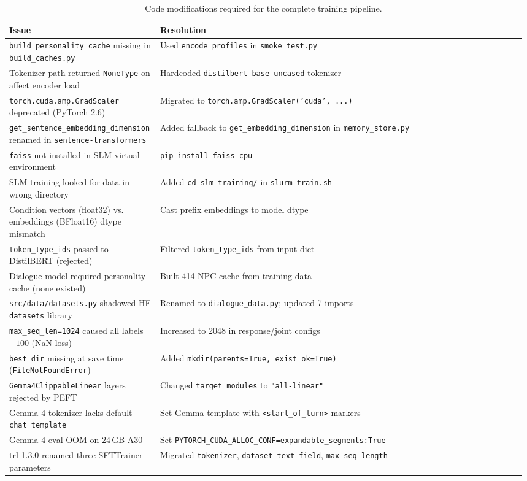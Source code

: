 \documentclass[11pt]{article}
\begin{document}
\begin{table}[t]
\centering
\caption{Code modifications required for the complete training pipeline.}
\label{tab:codefixes}
\scriptsize
\begin{tabular}{@{}p{0.28\linewidth}p{0.70\linewidth}@{}}
\toprule
\textbf{Issue} & \textbf{Resolution} \\
\midrule
\texttt{build\_personality\_cache} missing in \texttt{build\_caches.py} & Used \texttt{encode\_profiles} in \texttt{smoke\_test.py} \\
\midrule
Tokenizer path returned \texttt{NoneType} on affect encoder load & Hardcoded \texttt{distilbert-base-uncased} tokenizer \\
\midrule
\texttt{torch.cuda.amp.GradScaler} deprecated (PyTorch 2.6) & Migrated to \texttt{torch.amp.GradScaler('cuda', ...)} \\
\midrule
\texttt{get\_sentence\_embedding\_dimension} renamed in \texttt{sentence-transformers} & Added fallback to \texttt{get\_embedding\_dimension} in \texttt{memory\_store.py} \\
\midrule
\texttt{faiss} not installed in SLM virtual environment & \texttt{pip install faiss-cpu} \\
\midrule
SLM training looked for data in wrong directory & Added \texttt{cd slm\_training/} in \texttt{slurm\_train.sh} \\
\midrule
Condition vectors (float32) vs. embeddings (BFloat16) dtype mismatch & Cast prefix embeddings to model dtype \\
\midrule
\texttt{token\_type\_ids} passed to DistilBERT (rejected) & Filtered \texttt{token\_type\_ids} from input dict \\
\midrule
Dialogue model required personality cache (none existed) & Built 414-NPC cache from training data \\
\midrule
\texttt{src/data/datasets.py} shadowed HF \texttt{datasets} library & Renamed to \texttt{dialogue\_data.py}; updated 7 imports \\
\midrule
\texttt{max\_seq\_len=1024} caused all labels $-100$ (NaN loss) & Increased to 2048 in response/joint configs \\
\midrule
\texttt{best\_dir} missing at save time (\texttt{FileNotFoundError}) & Added \texttt{mkdir(parents=True, exist\_ok=True)} \\
\midrule
\texttt{Gemma4ClippableLinear} layers rejected by PEFT & Changed \texttt{target\_modules} to \texttt{"all-linear"} \\
\midrule
Gemma 4 tokenizer lacks default \texttt{chat\_template} & Set Gemma template with \texttt{<start\_of\_turn>} markers \\
\midrule
Gemma 4 eval OOM on 24\,GB A30 & Set \texttt{PYTORCH\_CUDA\_ALLOC\_CONF=expandable\_segments:True} \\
\midrule
trl 1.3.0 renamed three SFTTrainer parameters & Migrated \texttt{tokenizer}, \texttt{dataset\_text\_field}, \texttt{max\_seq\_length} \\
\bottomrule
\end{tabular}
\end{table}
\end{document}

